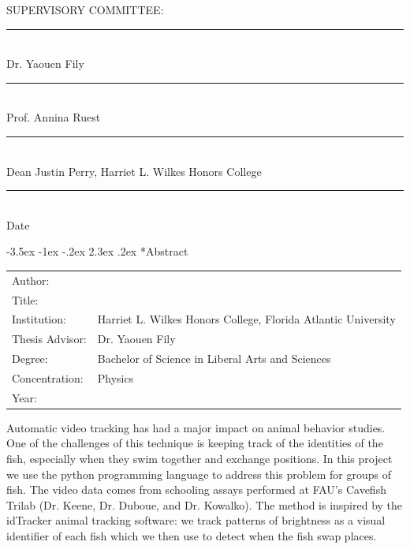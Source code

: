 \documentclass{article}
\makeatletter
\renewcommand\section{\clearpage\newpage\@startsection {section}{1}{\z@}%
	{-3.5ex \@plus -1ex \@minus -.2ex}%
	{2.3ex \@plus.2ex}%
	{\normalfont\Large\bfseries}}
\makeatother
\begin{document}
\vspace{1in}
SUPERVISORY COMMITTEE:

\newcommand{\myrule}{\vspace{0.5in}\rule{4in}{0.5pt} \\}

\myrule
Dr. Yaouen Fily 

\myrule 
Prof. Annina Ruest

\myrule
Dean Justin Perry, Harriet L. Wilkes Honors College 

\myrule
Date

\newpage


%
%


\section*{Abstract}

\myskip
\renewcommand{\arraystretch}{1.5}
\begin{tabular}{@{}l@{\hspace{3ex}}l}
	Author: & \myauthor \\
	Title: & \mytitle \\
	Institution: & Harriet L. Wilkes Honors College, Florida Atlantic University \\
	Thesis Advisor: & Dr. Yaouen Fily \\
	Degree: & Bachelor of Science in Liberal Arts and Sciences \\
	Concentration: & Physics \\
	Year: & \the\year
\end{tabular}

\myskip
\doublespace
Automatic video tracking has had a major impact on animal behavior studies. One of the challenges of this technique is keeping track of the identities of the fish, especially when they swim together and exchange positions. In this project we use the python programming language to address this problem for groups of fish. The video data comes from schooling assays performed at FAU's Cavefish Trilab (Dr. Keene, Dr. Duboue, and Dr. Kowalko). The method is inspired by the idTracker animal tracking software: we track patterns of brightness as a visual identifier of each fish which we then use to detect when the fish swap places.
\newpage
\end{document}
